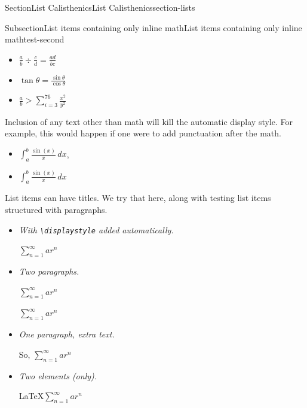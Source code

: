 \documentclass[twoside,10pt,]{article}
\newcommand{\mono}[1]{\texttt{#1}}
\newcommand{\lititle}[1]{{\slshape#1}}
\numberwithin{equation}{section}
\newcommand{\gt}{>}
\begin{document}
\begin{sectionptx}{Section}{List Calisthenics}{}{List Calisthenics}{}{}{section-lists}
\begin{subsectionptx}{Subsection}{List items containing only inline math}{}{List items containing only inline math}{}{}{test-second}
\begin{itemize}[label=\textbullet]
\begin{enumerate}
\item{}Math only, inline.%
\item{}Math only, with a newline.%
\item{}Math only, but in a paragraph. Also the next item on this list has math, just to see what happens in a nested list.%
\item{}\(\displaystyle \int_a^x \frac{d}{dt}f(t)\,dt = f(x)-f(a)\)%
\end{enumerate}
%
\item{}\(\displaystyle \frac{a}{b}\div \frac{c}{d} = \frac{ad}{bc}\)%
\item{}\(\displaystyle \tan\theta = \frac{\sin\theta}{\cos\theta}\)%
\item{}\(\displaystyle \frac{a}{b}\gt \sum_{i=3}^{76}\frac{x^2}{y^2}\)%
\end{itemize}
%
\par
Inclusion of any text other than math will kill the automatic display style. For example, this would happen if one were to add punctuation after the math.%
\par
%
\begin{itemize}[label=\textbullet]
\item{}\(\int_a^b \frac{\sin(x)}{x}\,dx\),%
\item{}\(\displaystyle \int_a^b \frac{\sin(x)}{x}\,dx\)%
\end{itemize}
%
\par
List items can have titles.  We try that here, along with testing list items structured with paragraphs.%
\begin{itemize}[label=\textbullet]
\item{}\lititle{With \mono{\textbackslash{}displaystyle} added automatically.}\par%
\(\displaystyle \sum_{n=1}^\infty ar^n\)%
\item{}\lititle{Two paragraphs.}\par%
\(\sum_{n=1}^\infty ar^n\)%
\par
\(\sum_{n=1}^\infty ar^n\)%
\item{}\lititle{One paragraph, extra text.}\par%
So, \(\sum_{n=1}^\infty ar^n\)%
\item{}\lititle{Two elements (only).}\par%
\LaTeX{}\(\sum_{n=1}^\infty ar^n\)%
\end{itemize}
%
\end{subsectionptx}
%
%
\typeout{************************************************}

\end{sectionptx}
\end{document}
